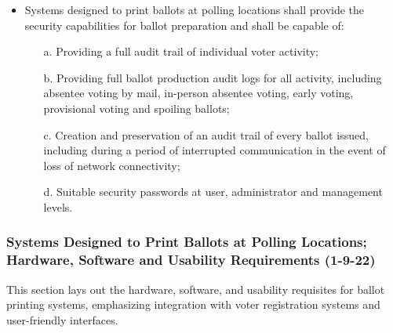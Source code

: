 \documentclass{article}
\begin{document}
\begin{itemize}
    \item Systems designed to print ballots at polling locations shall provide the security capabilities for ballot preparation and shall be capable of:
    \begin{itemize}
        \item[a.] Providing a full audit trail of individual voter activity;
        \item[b.] Providing full ballot production audit logs for all activity, including absentee voting by mail, in-person absentee voting, early voting, provisional voting and spoiling ballots;
        \item[c.] Creation and preservation of an audit trail of every ballot issued, including during a period of interrupted communication in the event of loss of network connectivity;
        \item[d.] Suitable security passwords at user, administrator and management levels.
    \end{itemize}
\end{itemize}

\subsubsection{Systems Designed to Print Ballots at Polling Locations; Hardware, Software and Usability Requirements (1-9-22)}
This section lays out the hardware, software, and usability requisites for ballot printing systems, emphasizing integration with voter registration systems and user-friendly interfaces.
\end{document}
